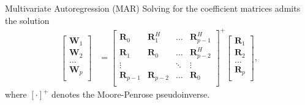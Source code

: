 \documentclass{beamer}
\begin{document}
  \begin{frame}{Multivariate Autoregression (MAR)}
    Solving for the coefficient matrices admits the solution
    \begin{align}
      \begin{bmatrix}
        \mathbf W_{1} \\ \mathbf W_{2} \\ \dots \\ \mathbf W_{p} \\
      \end{bmatrix}
      &= 
      \begin{bmatrix}
        \mathbf R_{0} & \mathbf R_1^H & \dots  & \mathbf R_{p-1}^H \\
        \mathbf R_{1} & \mathbf R_0   & \dots  & \mathbf R_{p-2}^H \\
        \vdots      &         & \ddots & \vdots \\
        \mathbf R_{p-1} & \mathbf R_{p-2}   & \dots  & \mathbf R_{0} \\
      \end{bmatrix}^{+}
      \begin{bmatrix}
        \mathbf R_{1} \\ \mathbf R_{2} \\ \dots \\ \mathbf R_{p} \\
      \end{bmatrix}, \label{eq:mar-solution}
    \end{align}
    where $[\cdot]^+$ denotes the Moore-Penrose pseudoinverse.
  \end{frame}
\end{document}
